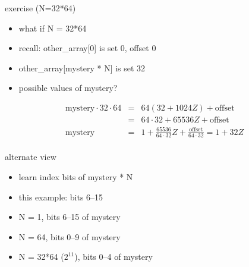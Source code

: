 \begin{frame}{exercise (N=32*64)}
    \begin{itemize}
    \item what if N = 32*64
    \item recall: other\_array[0] is set 0, offset 0
    \item other\_array[mystery * N] is set 32
    \item possible values of mystery?
    \end{itemize}
\vspace{-.5cm}
\begin{eqnarray*}
\text{mystery}\cdot 32\cdot 64 & = & 64(32+1024Z) + \text{offset} \\
        & = & 64\cdot32 + 65536Z + \text{offset}\\
\text{mystery} & = & 1 + \frac{65536}{64\cdot32}Z + \frac{\text{offset}}{64\cdot32} = 1+32Z \\
\end{eqnarray*}
\end{frame}

\begin{frame}{alternate view}
    \begin{itemize}
    \item learn index bits of mystery * N
    \item this example: bits 6--15
    \vspace{.5cm}
    \item N = 1, bits 6--15 of mystery
    \item N = 64, bits 0--9 of mystery
    \item N = 32*64 ($2^{11}$), bits 0--4 of mystery
    \end{itemize}
\end{frame}
